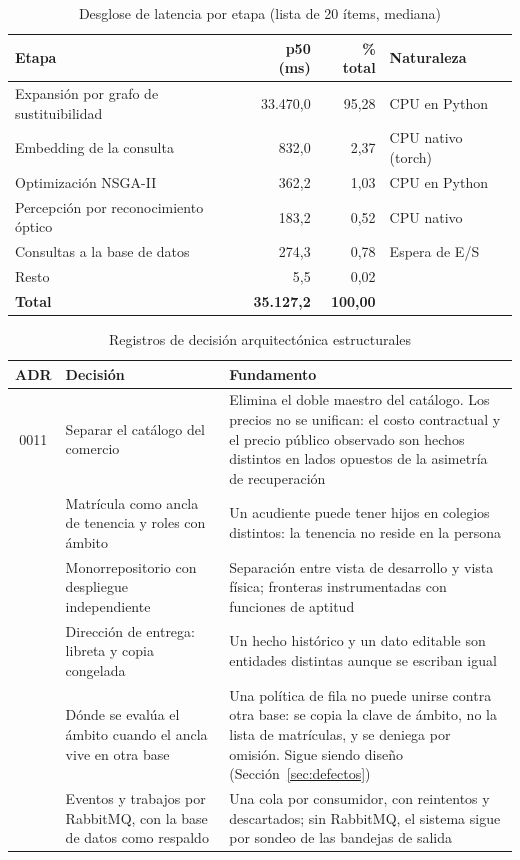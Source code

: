 \begin{table}[htbp]
\centering
\caption{Desglose de latencia por etapa (lista de 20 ítems, mediana)}
\label{tab:latencia}
\small
\begin{tabular}{@{}p{6.2cm}rrp{3.2cm}@{}}
\toprule
\textbf{Etapa} & \textbf{p50 (ms)} & \textbf{\% total} & \textbf{Naturaleza} \\
\midrule
Expansión por grafo de sustituibilidad & 33.470,0 & 95,28 & CPU en Python \\
Embedding de la consulta & 832,0 & 2,37 & CPU nativo (torch) \\
Optimización NSGA-II & 362,2 & 1,03 & CPU en Python \\
Percepción por reconocimiento óptico & 183,2 & 0,52 & CPU nativo \\
Consultas a la base de datos & 274,3 & 0,78 & Espera de E/S \\
Resto & 5,5 & 0,02 & \\
\midrule
\textbf{Total} & \textbf{35.127,2} & \textbf{100,00} & \\
\bottomrule
\end{tabular}
\end{table}

\begin{table}[htbp]
\centering
\caption{Registros de decisión arquitectónica estructurales}
\label{tab:adr}
\small
\begin{tabular}{@{}cp{5.0cm}p{7.6cm}@{}}
\toprule
\textbf{ADR} & \textbf{Decisión} & \textbf{Fundamento} \\
\midrule
0011 & Separar el catálogo del comercio & Elimina el doble maestro del catálogo. Los precios
no se unifican: el costo contractual y el precio público observado son hechos distintos en
lados opuestos de la asimetría de recuperación \\
\addlinespace
0012 & Matrícula como ancla de tenencia y roles con ámbito & Un acudiente puede tener hijos
en colegios distintos: la tenencia no reside en la persona \\
\addlinespace
0013 & Monorrepositorio con despliegue independiente & Separación entre vista de
desarrollo y vista física; fronteras instrumentadas con funciones de aptitud \\
\addlinespace
0014 & Dirección de entrega: libreta y copia congelada & Un hecho histórico y un dato
editable son entidades distintas aunque se escriban igual \\
\addlinespace
0015 & Dónde se evalúa el ámbito cuando el ancla vive en otra base & Una política de fila
no puede unirse contra otra base: se copia la clave de ámbito, no la lista de matrículas, y
se deniega por omisión. Sigue siendo diseño (Sección~\ref{sec:defectos}) \\
\addlinespace
0037 & Eventos y trabajos por RabbitMQ, con la base de datos como respaldo & Una cola por
consumidor, con reintentos y descartados; sin RabbitMQ, el sistema sigue por sondeo de las
bandejas de salida \\
\bottomrule
\end{tabular}
\end{table}

